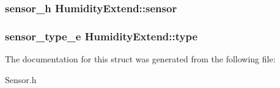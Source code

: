 \subsubsection[{sensor}]{\setlength{\rightskip}{0pt plus 5cm}sensor\-\_\-h Humidity\-Extend\-::sensor}\label{structHumidityExtend_a6d7661a3475ff4bfca05aea41336cecc}
\subsubsection[{type}]{\setlength{\rightskip}{0pt plus 5cm}sensor\-\_\-type\-\_\-e Humidity\-Extend\-::type}\label{structHumidityExtend_aafec809cfaca6f4a2d14d3f64342e7c0}


The documentation for this struct was generated from the following file\-:\begin{DoxyCompactItemize}
\item 
Sensor.\-h\end{DoxyCompactItemize}
